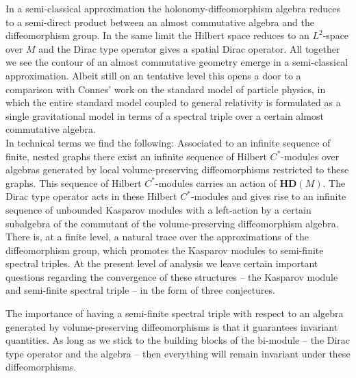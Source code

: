 \documentclass[12pt]{article}
\begin{document}
In a semi-classical approximation the holonomy-diffeomorphism algebra reduces to a semi-direct product between an almost commutative algebra and the diffeomorphism group. In the same limit the Hilbert space reduces to an $L^2$-space over $M$ and the Dirac type operator gives a spatial Dirac operator. All together we see the contour of an almost commutative geometry emerge in a semi-classical approximation. Albeit still on an tentative level this opens a door to a comparison with Connes' work on the standard model of particle physics, in which the entire standard model coupled to general relativity is formulated as a single gravitational model in terms of a spectral triple over a certain almost commutative algebra.\\






In technical terms we find the following: Associated to an infinite sequence of finite, nested graphs there exist an infinite sequence of Hilbert $C^*$-modules over algebras generated by local volume-preserving diffeomorphisms restricted to these graphs. This sequence of Hilbert $C^*$-modules carries an action of $\mathbf{HD}(M) $. The Dirac type operator acts in these Hilbert $C^*$-modules and gives rise to an infinite sequence
of unbounded Kasparov modules with a left-action by a certain subalgebra of the commutant of the volume-preserving diffeomorphism algebra. 
There is, at a finite level, a natural trace over the approximations of the diffeomorphism group, which promotes the Kasparov modules to semi-finite spectral triples. At the present level of analysis we leave certain important questions regarding the convergence of these structures -- the Kasparov module and semi-finite spectral triple -- in the form of three conjectures.

The importance  of having a semi-finite spectral triple with respect to an algebra generated by volume-preserving diffeomorphisms is that it guarantees invariant quantities. As long as we stick to the building blocks of the bi-module -- the Dirac type operator and the algebra -- then everything will remain invariant under these diffeomorphisms.\\
\end{document}
